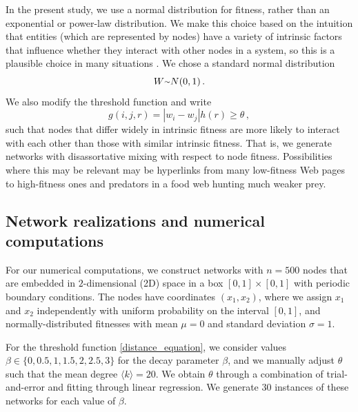 \documentclass[%
 reprint,
 amsmath,amssymb,
 aps,
]{revtex4-1}
\begin{document}
In the present study, we use a normal distribution for fitness, rather than an exponential or power-law distribution. We make this choice based on the intuition that entities (which are represented by nodes) have a variety of intrinsic factors that influence whether they interact with other nodes in a system, so this is a plausible choice in many situations \cite{frank}. 
We chose a standard normal distribution
\begin{equation}
        W {\raise.17ex\hbox{$\scriptstyle\mathtt{\sim}$}} N(0, 1)\,.
\end{equation}
We also modify the threshold function and write
\begin{equation}
    g(i, j, r) = |w_i - w_j| h(r) \geq \theta\,,
\end{equation}
such that nodes that differ widely in intrinsic fitness are more likely to interact with each other than those with similar intrinsic fitness. That is, we generate networks with disassortative mixing with respect to node fitness. Possibilities where this may be relevant may be hyperlinks from many low-fitness Web pages to high-fitness ones and predators in a food web hunting much weaker prey.


\subsection{Network realizations and numerical computations}\label{sec:fitness_numerics}

For our numerical computations, we construct networks with $n = 500$ nodes that are embedded in $2$-dimensional (2D) space in a box $[0, 1] \times [0, 1]$ with periodic boundary conditions. The nodes have coordinates $(x_1, x_2)$, where we assign $x_1$ and $x_2$ independently with uniform probability on the interval $[0,1]$, and normally-distributed fitnesses with mean $\mu = 0$ and standard deviation $\sigma = 1$. 

For the threshold function \eqref{distance_equation}, we consider values $\beta \in \{ 0, 0.5, 1, 1.5, 2, 2.5, 3 \}$ for the decay parameter $\beta$, and we manually adjust $\theta$ such that the mean degree $\langle k \rangle = 20$. We obtain $\theta$ through a combination of trial-and-error and fitting through linear regression. We generate $30$ instances of these networks for each value of $\beta$.
\end{document}
